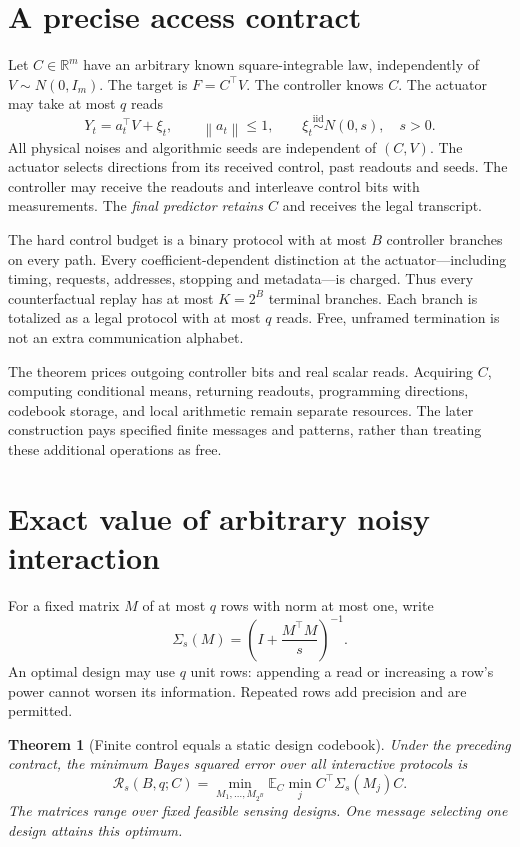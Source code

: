 \documentclass[11pt]{article}
\newcommand{\E}{\mathbb E}
\newcommand{\R}{\mathbb R}
\newcommand{\norm}[1]{\left\lVert#1\right\rVert}
\newtheorem{theorem}{Theorem}
\begin{document}
\section{A precise access contract}

Let $C\in\R^m$ have an arbitrary known square-integrable law, independently of $V\sim N(0,I_m)$. The target is $F=C^\top V$. The controller knows $C$. The actuator may take at most $q$ reads
\[
Y_t=a_t^\top V+\xi_t,\qquad \norm{a_t}\le1,\qquad \xi_t\stackrel{\mathrm{iid}}\sim N(0,s),\quad s>0.
\]
All physical noises and algorithmic seeds are independent of $(C,V)$. The actuator selects directions from its received control, past readouts and seeds. The controller may receive the readouts and interleave control bits with measurements. The \emph{final predictor retains $C$} and receives the legal transcript.

The hard control budget is a binary protocol with at most $B$ controller branches on every path. Every coefficient-dependent distinction at the actuator---including timing, requests, addresses, stopping and metadata---is charged. Thus every counterfactual replay has at most $K=2^B$ terminal branches. Each branch is totalized as a legal protocol with at most $q$ reads. Free, unframed termination is not an extra communication alphabet.

The theorem prices outgoing controller bits and real scalar reads. Acquiring $C$, computing conditional means, returning readouts, programming directions, codebook storage, and local arithmetic remain separate resources. The later construction pays specified finite messages and patterns, rather than treating these additional operations as free.

\section{Exact value of arbitrary noisy interaction}

For a fixed matrix $M$ of at most $q$ rows with norm at most one, write
\[
\Sigma_s(M)=\left(I+\frac{M^\top M}{s}\right)^{-1}.
\]
An optimal design may use $q$ unit rows: appending a read or increasing a row's power cannot worsen its information. Repeated rows add precision and are permitted.

\begin{theorem}[Finite control equals a static design codebook]
Under the preceding contract, the minimum Bayes squared error over all interactive protocols is
\begin{equation}
\boxed{\mathcal R_s(B,q;C)=
\min_{M_1,\ldots,M_{2^B}}
\E_C\min_j C^\top\Sigma_s(M_j)C.}
\label{eq:main}
\end{equation}
The matrices range over fixed feasible sensing designs. One message selecting one design attains this optimum.
\end{theorem}
\end{document}
